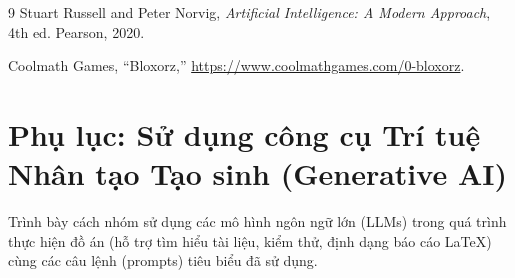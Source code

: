 \documentclass[12pt,a4paper]{article}
\begin{document}
\begin{thebibliography}{9}
Stuart Russell and Peter Norvig, \emph{Artificial Intelligence: A Modern Approach}, 4th ed. Pearson, 2020.

Coolmath Games, ``Bloxorz,'' \url{https://www.coolmathgames.com/0-bloxorz}.
\end{thebibliography}

\newpage
\appendix
\section{Phụ lục: Sử dụng công cụ Trí tuệ Nhân tạo Tạo sinh (Generative AI)}
Trình bày cách nhóm sử dụng các mô hình ngôn ngữ lớn (LLMs) trong quá trình thực hiện đồ án (hỗ trợ tìm hiểu tài liệu, kiểm thử, định dạng báo cáo LaTeX) cùng các câu lệnh (prompts) tiêu biểu đã sử dụng.
\end{document}
